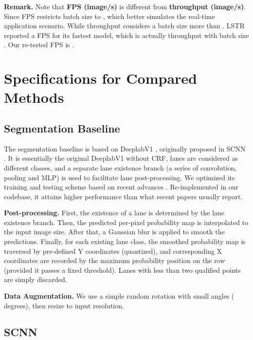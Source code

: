 \documentclass[10pt,twocolumn,letterpaper]{article}
\begin{document}
\vspace{1mm}

\noindent \textbf{Remark.} Note that \textbf{FPS (image/s)} is different from \textbf{throughput (image/s)}. Since FPS restricts batch size to , which better simulates the real-time application scenario. While throughput considers a batch size more than . LSTR \cite{liu2021end} reported a  FPS for its fastest model, which is actually throughput with batch size . Our re-tested FPS is .

\section{Specifications for Compared Methods}
\label{sec:specs}

\subsection{Segmentation Baseline}
\label{subsec:segbase}

The segmentation baseline is based on DeeplabV1 \cite{deeplabv1}, originally proposed in SCNN \cite{pan2018spatial}. It is essentially the original DeeplabV1 without CRF, lanes are considered as different classes, and a separate lane existence branch (a series of convolution, pooling and MLP) is used to facilitate lane post-processing. We optimized its training and testing scheme based on recent advances \cite{zheng2021resa}. Re-implemented in our codebase, it attains higher performance than what recent papers usually report.

\noindent \textbf{Post-processing.} First, the existence of a lane is determined by the lane existence branch. Then, the predicted per-pixel probability map is interpolated to the input image size. After that, a  Gaussian blur is applied to smooth the predictions. Finally, for each existing lane class, the smoothed probability map is traversed by pre-defined Y coordinates (quantized), and corresponding X coordinates are recorded by the maximum probability position on the row (provided it passes a fixed threshold). Lanes with less than two qualified points are simply discarded.

\noindent \textbf{Data Augmentation.} We use a simple random rotation with small angles ( degrees), then resize to input resolution.

\subsection{SCNN}
\label{subsec:scnn}
\end{document}
